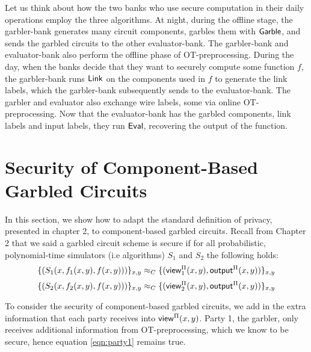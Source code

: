 Let us think about how the two banks who use secure computation in their daily operations employ the three algorithms.
At night, during the offline stage, the garbler-bank generates many circuit components, garbles them with $\sf{Garble}$, and sends the garbled circuits to the other evaluator-bank. 
The garbler-bank and evaluator-bank also perform the offline phase of OT-preprocessing.
During the day, when the banks decide that they want to securely compute some function $f$, the garbler-bank runs $\sf{Link}$ on the components used in $f$ to generate the link labels, which the garbler-bank subsequently sends to the evaluator-bank.
The garbler and evaluator also exchange wire labels, some via online OT-preprocessing. 
Now that the evaluator-bank has the garbled components, link labels and input labels, they run $\sf{Eval}$, recovering the output of the function.

\section{Security of Component-Based Garbled Circuits}

In this section, we show how to adapt the standard definition of privacy, presented in chapter 2, to component-based garbled circuits.
Recall from Chapter 2 that we said a garbled circuit scheme is secure if for all probabilistic, polynomial-time simulators (i.e algorithms) $S_1$ and $S_2$ the following holds:
\begin{equation}
\label{eqn:party1}
    \{(S_1(x, f_1(x,y), f(x,y)))\}_{x,y} \approx_C \{({\sf view}^{\Pi}_1(x,y), {\sf output}^{\Pi}(x,y)) \}_{x,y}
\end{equation}
\begin{equation}
\label{eqn:party2}
    \{(S_2(x, f_2(x,y), f(x,y)))\}_{x,y} \approx_C \{({\sf view}^{\Pi}_2(x,y), {\sf output}^{\Pi}(x,y)) \}_{x,y}
\end{equation}

To consider the security of component-based garbled circuits, we add in the extra information that each party receives into ${\sf view}^{\Pi}(x,y)$. 
Party 1, the garbler, only receives additional information from OT-preprocessing, which we know to be secure, hence equation \ref{eqn:party1} remains true. 


